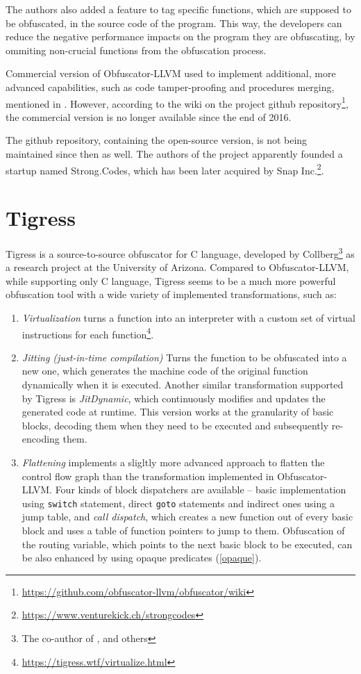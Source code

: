 \documentclass[
  digital, %
  notable,   %
  twoside, %
  nolof,     %
  nolot,     %
]{fithesis3}
\theoremstyle{definition}
\begin{document}
The authors also added a feature to tag specific functions, which are supposed to be obfuscated, in the source code of the program. This way, the developers can reduce the negative performance impacts on the program they are obfuscating, by ommiting non-crucial functions from the obfuscation process. 

Commercial version of Obfuscator-LLVM used to implement additional, more advanced capabilities, such as code tamper-proofing and procedures merging, mentioned in \cite{obfuscator-llvm}. However, according to the wiki on the project github repository\footnote{\url{https://github.com/obfuscator-llvm/obfuscator/wiki}}, the commercial version is no longer available since the end of 2016. 

The github repository, containing the open-source version, is not being maintained since then as well. The authors of the project apparently founded a startup named Strong.Codes, which has been later acquired by Snap Inc.\footnote{\url{https://www.venturekick.ch/strongcodes}}.

\section{Tigress}

Tigress is a source-to-source obfuscator for C language, developed by Collberg\footnote{The co-author of \cite{taxonomy_obf}, \cite{manufacturing_opaque} and others} as a research project at the University of Arizona. Compared to Obfuscator-LLVM, while supporting only C language, Tigress seems to be a much more powerful obfuscation tool with a wide variety of implemented transformations, such as:
\begin{enumerate}
    \item \textit{Virtualization} turns a function into an interpreter with a custom set of virtual instructions for each function\footnote{\url{https://tigress.wtf/virtualize.html}}.
    \item \textit{Jitting (just-in-time compilation)} Turns the function to be obfuscated into a new one, which generates the machine code of the original function dynamically when it is executed. Another similar transformation supported by Tigress is \textit{JitDynamic}, which continuously modifies and updates the generated code at runtime. This version works at the granularity of basic blocks, decoding them when they need to be executed and subsequently re-encoding them.
    \item \textit{Flattening} implements a sligltly more advanced approach to flatten the control flow graph than the transformation implemented in Obfuscator-LLVM. Four kinds of block dispatchers are available -- basic implementation using \texttt{switch} statement, direct \texttt{goto} statements and indirect ones using a jump table, and \textit{call dispatch}, which creates a new function out of every basic block and uses a table of function pointers to jump to them. Obfuscation of the routing variable, which points to the next basic block to be executed, can be also enhanced by using opaque predicates (\ref{opaque}).
    
\end{enumerate}
\end{document}
